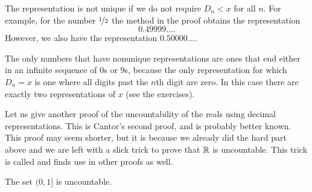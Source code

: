 The representation is not unique if we do not require
$D_n < x$ for all $n$.
For example, for the
number $\nicefrac{1}{2}$ the method in the proof obtains the representation
\begin{equation*}
0.49999\ldots .
\end{equation*}
However, we also have the representation $0.50000\ldots$.

The only numbers that have nonunique
representations are ones that end either in an infinite sequence of $0$s
or $9$s, because the only representation for which
$D_n = x$ is one where all digits past the $n$th digit are zero.  In this case
there are exactly two representations of $x$ (see the exercises).

Let us give another proof of the uncountability of the reals using decimal
representations.
This is Cantor's second proof, and is probably better known.
This proof may seem shorter, but it is because we already did
the hard part above and we are left with a slick trick to prove that ${\mathbb{R}}$ is
uncountable.  This trick is called
\emph{} and
finds use in other proofs as well.

\begin{thm}[Cantor]
The set $(0,1]$ is uncountable.
\end{thm}

